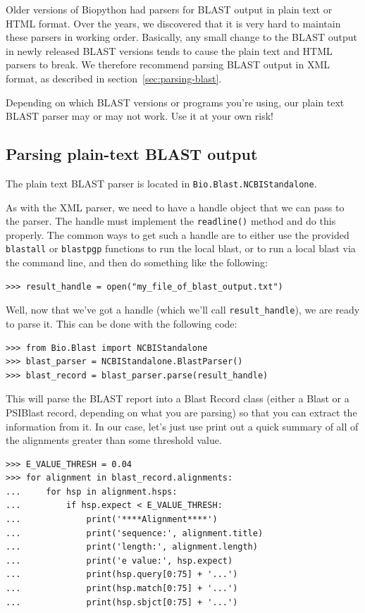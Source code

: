 \documentclass{report}
\begin{document}
Older versions of Biopython had parsers for BLAST output in plain text or HTML
format. Over the years, we discovered that it is very hard to maintain these
parsers in working order. Basically, any small change to the BLAST output in
newly released BLAST versions tends to cause the plain text and HTML parsers
to break. We therefore recommend parsing BLAST output in XML format, as
described in section~\ref{sec:parsing-blast}.

Depending on which BLAST versions or programs you're using, our plain text BLAST parser may or may not work. Use it at your own risk!

\subsection{Parsing plain-text BLAST output}

The plain text BLAST parser is located in \verb|Bio.Blast.NCBIStandalone|.

As with the XML parser, we need to have a handle object that we can pass to the parser. The handle must implement the \verb|readline()| method and do this properly. The common ways to get such a handle are to either use the provided \verb|blastall| or \verb|blastpgp| functions to run the local blast, or to run a local blast via the command line, and then do something like the following:

\begin{verbatim}
>>> result_handle = open("my_file_of_blast_output.txt")
\end{verbatim}

Well, now that we've got a handle (which we'll call \verb|result_handle|),
we are ready to parse it. This can be done with the following code:

\begin{verbatim}
>>> from Bio.Blast import NCBIStandalone
>>> blast_parser = NCBIStandalone.BlastParser()
>>> blast_record = blast_parser.parse(result_handle)
\end{verbatim}

This will parse the BLAST report into a Blast Record class (either a Blast or a PSIBlast record, depending on what you are parsing) so that you can extract the information from it. In our case, let's just use print out a quick summary of all of the alignments greater than some threshold value.

\begin{verbatim}
>>> E_VALUE_THRESH = 0.04
>>> for alignment in blast_record.alignments:
...     for hsp in alignment.hsps:
...         if hsp.expect < E_VALUE_THRESH:
...             print('****Alignment****')
...             print('sequence:', alignment.title)
...             print('length:', alignment.length)
...             print('e value:', hsp.expect)
...             print(hsp.query[0:75] + '...')
...             print(hsp.match[0:75] + '...')
...             print(hsp.sbjct[0:75] + '...')
\end{verbatim}
\end{document}
